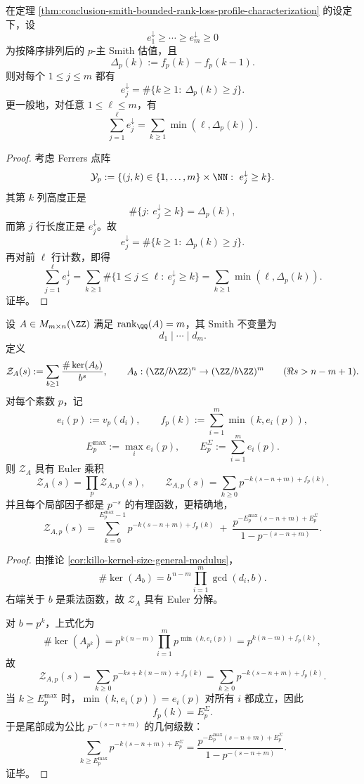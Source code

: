 \begin{corollary}\label{cor:conclusion-smith-loss-profile-young-duality}
在定理 \ref{thm:conclusion-smith-bounded-rank-loss-profile-characterization} 的设定下，设
\[
e_1^\downarrow\ge\cdots\ge e_m^\downarrow\ge 0
\]
为按降序排列后的 \(p\)-主 Smith 估值，且
\[
\Delta_p(k):=f_p(k)-f_p(k-1).
\]
则对每个 \(1\le j\le m\) 都有
\[
\boxed{\;
e_j^\downarrow=\#\{k\ge 1:\ \Delta_p(k)\ge j\}.\;}
\]
更一般地，对任意 \(1\le \ell\le m\)，有
\[
\boxed{\;
\sum_{j=1}^{\ell}e_j^\downarrow
=
\sum_{k\ge 1}\min(\ell,\Delta_p(k)).\;}
\]
\end{corollary}
\begin{proof}
考虑 Ferrers 点阵
\[
\mathcal Y_p:=\{(j,k)\in\{1,\dots,m\}\times \NN:\ e_j^\downarrow\ge k\}.
\]
其第 \(k\) 列高度正是
\[
\#\{j:\ e_j^\downarrow\ge k\}=\Delta_p(k),
\]
而第 \(j\) 行长度正是 \(e_j^\downarrow\)。故
\[
e_j^\downarrow=\#\{k\ge 1:\ \Delta_p(k)\ge j\}.
\]
再对前 \(\ell\) 行计数，即得
\[
\sum_{j=1}^{\ell}e_j^\downarrow
=
\sum_{k\ge 1}\#\{1\le j\le \ell:\ e_j^\downarrow\ge k\}
=
\sum_{k\ge 1}\min(\ell,\Delta_p(k)).
\]
证毕。
\end{proof}

\begin{theorem}\label{thm:conclusion-smith-kernel-dirichlet-euler-rational-local-factors}
设 \(A\in M_{m\times n}(\ZZ)\) 满足 \(\operatorname{rank}_{\QQ}(A)=m\)，其 Smith 不变量为
\[
d_1\mid\cdots\mid d_m.
\]
定义
\[
\mathcal Z_A(s):=\sum_{b\ge 1}\frac{\#\ker(A_b)}{b^s},
\qquad
A_b:(\ZZ/b\ZZ)^n\to(\ZZ/b\ZZ)^m
\qquad
(\Re s>n-m+1).
\]
对每个素数 \(p\)，记
\[
e_i(p):=v_p(d_i),
\qquad
f_p(k):=\sum_{i=1}^{m}\min(k,e_i(p)),
\]
\[
E_p^{\max}:=\max_i e_i(p),
\qquad
E_p^{\Sigma}:=\sum_{i=1}^{m}e_i(p).
\]
则 \(\mathcal Z_A\) 具有 Euler 乘积
\[
\boxed{\;
\mathcal Z_A(s)=\prod_p \mathcal Z_{A,p}(s),\qquad
\mathcal Z_{A,p}(s)=\sum_{k\ge 0}p^{-k(s-n+m)+f_p(k)}.\;}
\]
并且每个局部因子都是 \(p^{-s}\) 的有理函数，更精确地，
\[
\boxed{\;
\mathcal Z_{A,p}(s)
=
\sum_{k=0}^{E_p^{\max}-1}p^{-k(s-n+m)+f_p(k)}
\;+\;
\frac{p^{-E_p^{\max}(s-n+m)+E_p^{\Sigma}}}{1-p^{-(s-n+m)}}.\;}
\]
\end{theorem}
\begin{proof}
由推论 \ref{cor:killo-kernel-size-general-modulus}，
\[
\#\ker(A_b)=b^{\,n-m}\prod_{i=1}^{m}\gcd(d_i,b).
\]
右端关于 \(b\) 是乘法函数，故 \(\mathcal Z_A\) 具有 Euler 分解。

对 \(b=p^k\)，上式化为
\[
\#\ker(A_{p^k})
=
p^{k(n-m)}\prod_{i=1}^{m}p^{\min(k,e_i(p))}
=
p^{k(n-m)+f_p(k)},
\]
故
\[
\mathcal Z_{A,p}(s)=\sum_{k\ge 0}p^{-ks+k(n-m)+f_p(k)}
=
\sum_{k\ge 0}p^{-k(s-n+m)+f_p(k)}.
\]
当 \(k\ge E_p^{\max}\) 时，\(\min(k,e_i(p))=e_i(p)\) 对所有 \(i\) 都成立，因此
\[
f_p(k)=E_p^{\Sigma}.
\]
于是尾部成为公比 \(p^{-(s-n+m)}\) 的几何级数：
\[
\sum_{k\ge E_p^{\max}}p^{-k(s-n+m)+E_p^{\Sigma}}
=
\frac{p^{-E_p^{\max}(s-n+m)+E_p^{\Sigma}}}{1-p^{-(s-n+m)}}.
\]
证毕。
\end{proof}


